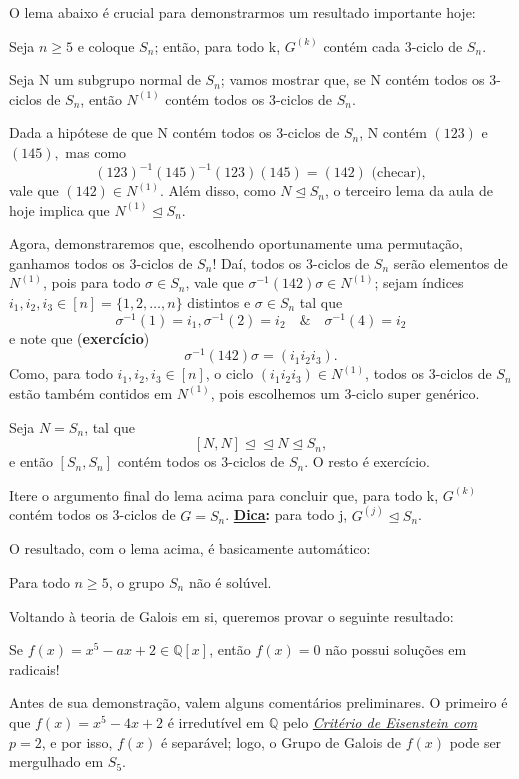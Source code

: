 \documentclass[../algebraIII_notes.tex]{subfiles}
\begin{document}
O lema abaixo é crucial para demonstrarmos um resultado importante hoje:
\begin{lemma*}
	Seja \(n\geq 5\) e coloque \(S_{n}\); então, para todo k, \(G^{(k)}\) contém cada 3-ciclo de \(S_{n}\).
\end{lemma*}
\begin{proof*}
	Seja N um subgrupo normal de \(S_{n}\); vamos mostrar que, se N contém todos os 3-ciclos de \(S_{n}\), então \(N^{(1)}\) contém todos os 3-ciclos de \(S_{n}\).

	Dada a hipótese de que N contém todos os 3-ciclos de \(S_{n}\), N contém \((123)\) e \((145),\) mas como
	\[
		(123)^{-1}(145)^{-1}(123)(145)=(142) \text{    (checar)},
	\]
	vale que \((142)\in N^{(1)}\). Além disso, como \(N\trianglelefteq S_{n}\), o terceiro lema da aula de hoje implica que \(N^{(1)}\trianglelefteq S_{n}\).

	Agora, demonstraremos que, escolhendo oportunamente uma permutação, ganhamos todos os 3-ciclos de \(S_{n}\)! Daí, todos os 3-ciclos de \(S_{n}\) serão elementos de \(N^{(1)}\), pois para todo \(\sigma \in S_{n}\), vale que \(\sigma^{-1}(142)\sigma \in N^{(1)}\); sejam índices \(i_1, i_2, i_3\in [n]=\{1, 2, \dotsc , n\}\) distintos e \(\sigma \in S_{n}\) tal que
	\[
		\sigma^{-1}(1) = i_1, \sigma^{-1}(2)=i_2 \quad\&\quad \sigma^{-1}(4) = i_2
	\]
	e note que (\textbf{exercício})
	\[
		\sigma^{-1}(142)\sigma=(i_1i_2i_3).
	\]
	Como, para todo \(i_1, i_2, i_3\in [n]\), o ciclo \((i_1i_2i_3)\in N^{(1)}\), todos os 3-ciclos de \(S_{n}\) estão também contidos em \(N^{(1)}\), pois escolhemos um 3-ciclo super genérico.

	Seja \(N = S_{n}\), tal que
	\[
		[N, N]\trianglelefteq \trianglelefteq N\trianglelefteq S_{n},
	\]
	e então \([S_{n}, S_{n}]\) contém todos os 3-ciclos de \(S_{n}\). O resto é exercício. \qedsymbol
\end{proof*}
\begin{exr}
	Itere o argumento final do lema acima para concluir que, para todo k, \(G^{(k)}\) contém todos os 3-ciclos de \(G=S_{n}\). \textbf{\underline{Dica}:} para todo j, \(G^{(j)}\trianglelefteq S_{n}\).
\end{exr}
O resultado, com o lema acima, é basicamente automático:
\begin{theorem*}
	Para todo \(n\geq 5\), o grupo \(S_{n}\) não é solúvel.
\end{theorem*}

Voltando à teoria de Galois em si, queremos provar o seguinte resultado:
\begin{theorem*}
	Se \(f(x)=x^{5}-ax+2\in \mathbb{Q}[x]\), então \(f(x)=0\) não possui soluções em radicais!
\end{theorem*}
Antes de sua demonstração, valem alguns comentários preliminares. O primeiro é que \(f(x)=x^{5}-4x + 2\) é irredutível em \(\mathbb{Q}\) pelo \hyperlink{eisenstein_criterion}{\textit{Critério de Eisenstein com \(p=2\)}}, e por isso, \(f(x)\) é separável; logo, o Grupo de Galois de \(f(x)\) pode ser mergulhado em \(S_5\).
\end{document}
